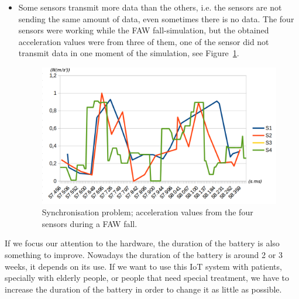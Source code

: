 \documentclass[journal]{IEEEtran}
\begin{document}
\begin{itemize}
 The acceleration values show that in less than 250 milliseconds there are more than 30 values from ``fall 1'', and
 in more than 350 milliseconds there are 12 values from ``fall 2''. There is a lack of synchronisation not only in
 the amount of data, but also in the time.
 
 \item Some sensors transmit more data than the others, i.e. the sensors are not 
 sending the same amount of data, even sometimes there is no data. The four sensors were working while the FAW fall-simulation, but the obtained acceleration values were from three of them, one of the sensor did not transmit data 
 in one moment of the simulation, see Figure~\ref{fig:synchronisation2}.
 
 \begin{figure}[!ht]
  \centering
  \includegraphics[scale=0.22]{img/synchronisation2.png}
  \caption[Comparison acceleration during two FAW falls]{Synchronisation problem; acceleration values from the four sensors during a FAW fall.}
  \label{fig:synchronisation2}
 \end{figure}
\end{itemize}

If we focus our attention to the hardware, the duration of the battery is also something to improve. Nowadays the 
duration of the battery is around 2 or 3 weeks, it depends on its use. If we want to use this IoT system with patients, 
specially with elderly people, or people that need special treatment, we have to increase the duration of the battery 
in order to change it as little as possible.
\end{document}
